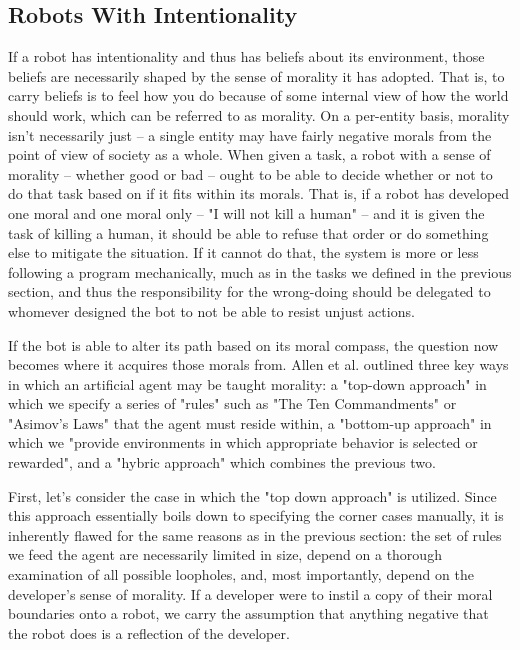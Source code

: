 \documentclass[12]{article}
\begin{document}
	\subsection{Robots With Intentionality}
		If a robot has intentionality and thus has beliefs about its environment, those beliefs are necessarily shaped by the sense of morality it has adopted. That is, to carry beliefs is to feel how you do because of some internal view of how the world should work, which can be referred to as morality. On a per-entity basis, morality isn't necessarily just -- a single entity may have fairly negative morals from the point of view of society as a whole. When given a task, a robot with a sense of morality -- whether good or bad -- ought to be able to decide whether or not to do that task based on if it fits within its morals. That is, if a robot has developed one moral and one moral only -- "I will not kill a human" -- and it is given the task of killing a human, it should be able to refuse that order or do something else to mitigate the situation. If it cannot do that, the system is more or less following a program mechanically, much as in the tasks we defined in the previous section, and thus the responsibility for the wrong-doing should be delegated to whomever designed the bot to not be able to resist unjust actions.
		
		If the bot is able to alter its path based on its moral compass, the question now becomes where it acquires those morals from. Allen et al. outlined three key ways in which an artificial agent may be taught morality: a "top-down approach" in which we specify a series of "rules" such as "The Ten Commandments" or "Asimov's Laws" that the agent must reside within, a "bottom-up approach" in which we "provide environments in which appropriate behavior is selected or rewarded", and a "hybric approach" which combines the previous two\cite{morality}. 
		
		First, let's consider the case in which the "top down approach"\cite{morality} is utilized. Since this approach essentially boils down to specifying the corner cases manually, it is inherently flawed for the same reasons as in the previous section: the set of rules we feed the agent are necessarily limited in size, depend on a thorough examination of all possible loopholes, and, most importantly, depend on the developer's sense of morality. If a developer were to instil a copy of their moral boundaries onto a robot, we carry the assumption that anything negative that the robot does is a reflection of the developer.  
\end{document}
